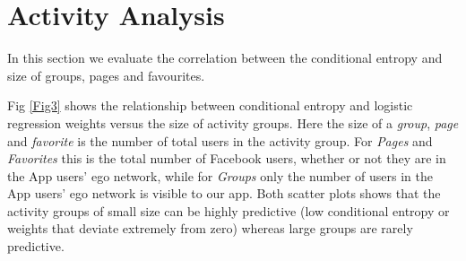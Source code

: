 
\section{Activity Analysis}


In this section we evaluate the correlation between the conditional
entropy and size of groups, pages and favourites.

Fig \ref{Fig3} shows the relationship between conditional
    entropy and logistic regression weights versus the size of activity
    groups. Here the size of a {\em group}, {\em page} and {\em favorite} 
    is the number of total users in the activity group. 
    For {\em Pages} and {\em Favorites} this is the total number of Facebook users, 
    whether or not they are in the App users' ego network, while for 
    {\em Groups} only the number of users in the App users' ego network is visible to our app.
    Both scatter plots shows that the activity groups of small size can be
    highly predictive (low conditional entropy or weights that deviate
    extremely from zero) whereas large groups are rarely predictive.

